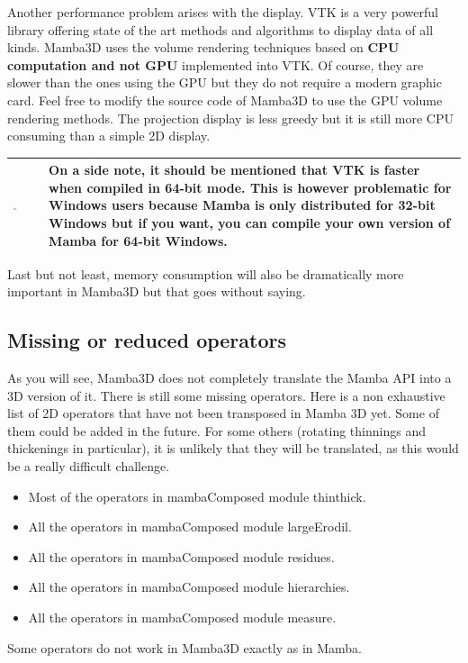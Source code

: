 \documentclass[a4paper,10pt,oneside]{article}
\newenvironment{tipBox}
{
    \begin{center}
    \begin{tabular}{ | b{0.1\textwidth} b{0.8\textwidth} | }
    \hline
    \rowcolor{lightblue}
    \includegraphics[width=0.1\textwidth]{Crystal_Clear_action_info.png} &
}
{
    \\
    \hline
    \end{tabular}
    \end{center}
}
\begin{document}
Another performance problem arises with the display. VTK is a very powerful
library offering state of the art methods and algorithms to display 
data of all kinds. Mamba3D uses the volume rendering techniques based on 
\textbf{CPU computation and not GPU} implemented into VTK. Of course, they
are slower than the ones using the GPU but they do not require a modern
graphic card. Feel free to modify the source code of Mamba3D to use the
GPU volume rendering methods. The projection display is less greedy but it
is still more CPU consuming than a simple 2D display.

\begin{tipBox}
On a side note, it should be mentioned that VTK is faster when compiled in
64-bit mode. This is however problematic for Windows users because Mamba is
only distributed for 32-bit Windows but if you want, you can compile your
own version of Mamba for 64-bit Windows.
\end{tipBox}

Last but not least, memory consumption will also be dramatically more important
in Mamba3D but that goes without saying.

\subsection{Missing or reduced operators}
\label{cha:missing}

As you will see, Mamba3D does not completely translate the Mamba API into
a 3D version of it. There is still some missing operators. Here is a non
exhaustive list of 2D operators that have not been transposed in Mamba 3D yet.
Some of them could be added in the future. For some others (rotating thinnings
and thickenings in particular), it is unlikely that they will be translated, as
this would be a really difficult challenge.

\begin{itemize}
\item Most of the operators in mambaComposed module thinthick.
\item All the operators in mambaComposed module largeErodil.
\item All the operators in mambaComposed module residues.
\item All the operators in mambaComposed module hierarchies.
\item All the operators in mambaComposed module measure.
\end{itemize}

Some operators do not work in Mamba3D exactly as in Mamba.
\end{document}
